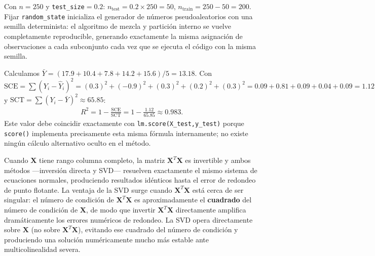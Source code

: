 \begin{solproblema}[prob:ab54576]
	Con $n=250$ y \texttt{test\_size}$=0.2$: $n_{\text{test}}=0.2\times250=50$, $n_{\text{train}}=250-50=200$. Fijar \texttt{random\_state} inicializa el generador de números pseudoaleatorios con una semilla determinista: el algoritmo de mezcla y partición interno se vuelve completamente reproducible, generando exactamente la misma asignación de observaciones a cada subconjunto cada vez que se ejecuta el código con la misma semilla.
\end{solproblema}

\begin{solproblema}[prob:7554cf7]
	Calculamos $\bar Y=(17.9+10.4+7.8+14.2+15.6)/5=13.18$. Con $\text{SCE}=\sum(Y_i-\hat Y_i)^2=(0.3)^2+(-0.9)^2+(0.3)^2+(0.2)^2+(0.3)^2=0.09+0.81+0.09+0.04+0.09=1.12$ y $\text{SCT}=\sum(Y_i-\bar Y)^2\approx65.85$:
	\begin{align}
		R^2=1-\frac{\text{SCE}}{\text{SCT}}=1-\frac{1.12}{65.85}\approx0.983.
	\end{align}
	Este valor debe coincidir exactamente con \texttt{lm.score(X\_test,y\_test)} porque \texttt{score()} implementa precisamente esta misma fórmula internamente; no existe ningún cálculo alternativo oculto en el método.
\end{solproblema}

\begin{solproblema}[prob:011e008]
	Cuando $\mathbf{X}$ tiene rango columna completo, la matriz $\mathbf{X}^T\mathbf{X}$ es invertible y ambos métodos —inversión directa y SVD— resuelven exactamente el mismo sistema de ecuaciones normales, produciendo resultados idénticos hasta el error de redondeo de punto flotante. La ventaja de la SVD surge cuando $\mathbf{X}^T\mathbf{X}$ está cerca de ser singular: el número de condición de $\mathbf{X}^T\mathbf{X}$ es aproximadamente el \textbf{cuadrado} del número de condición de $\mathbf{X}$, de modo que invertir $\mathbf{X}^T\mathbf{X}$ directamente amplifica dramáticamente los errores numéricos de redondeo. La SVD opera directamente sobre $\mathbf{X}$ (no sobre $\mathbf{X}^T\mathbf{X}$), evitando ese cuadrado del número de condición y produciendo una solución numéricamente mucho más estable ante multicolinealidad severa.
\end{solproblema}

